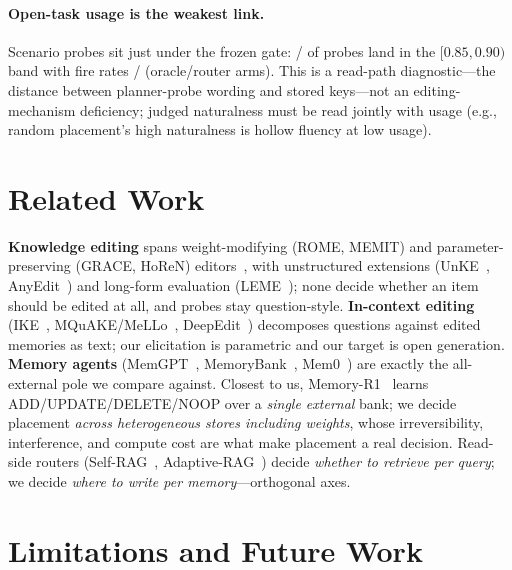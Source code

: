 \documentclass{article}
\begin{document}
\paragraph{Open-task usage is the weakest link.} Scenario probes sit just under the frozen gate: \HistBandSfour/\HistBandSfive{} of \HistProbeN{} probes land in the $[0.85,0.90)$ band with fire rates \FireRateSfour/\FireRateSfive{} (oracle/router arms). This is a read-path diagnostic---the distance between planner-probe wording and stored keys---not an editing-mechanism deficiency; judged naturalness must be read jointly with usage (e.g., random placement's high naturalness is hollow fluency at low usage).

\section{Related Work}
\label{sec:related}

\textbf{Knowledge editing} spans weight-modifying (ROME, MEMIT) and parameter-preserving (GRACE, HoReN) editors~\citep{meng2022rome,meng2023memit,hartvigsen2023grace,horen2026}, with unstructured extensions (UnKE~\citep{deng2025unke}, AnyEdit~\citep{jiang2025anyedit}) and long-form evaluation (LEME~\citep{rosati2024leme}); none decide whether an item should be edited at all, and probes stay question-style. \textbf{In-context editing} (IKE~\citep{zheng2023ike}, MQuAKE/MeLLo~\citep{zhong2023mquake}, DeepEdit~\citep{wang2024deepedit}) decomposes questions against edited memories as text; our elicitation is parametric and our target is open generation. \textbf{Memory agents} (MemGPT~\citep{packer2023memgpt}, MemoryBank~\citep{zhong2024memorybank}, Mem0~\citep{chhikara2025mem0}) are exactly the all-external pole we compare against. Closest to us, Memory-R1~\citep{yan2025memoryr1} learns ADD/UPDATE/DELETE/NOOP over a \emph{single external} bank; we decide placement \emph{across heterogeneous stores including weights}, whose irreversibility, interference, and compute cost are what make placement a real decision. Read-side routers (Self-RAG~\citep{asai2024selfrag}, Adaptive-RAG~\citep{jeong2024adaptiverag}) decide \emph{whether to retrieve per query}; we decide \emph{where to write per memory}---orthogonal axes.

\section{Limitations and Future Work}
\label{sec:limitations}
\end{document}
